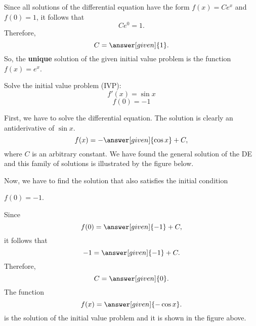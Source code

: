 \documentclass{ximera}
\begin{document}
\begin{question}
\begin{feedback}
Since all solutions of the differential equation have the form $f(x)=Ce^x$ and $f(0)=1$, it follows that 
  \[
  Ce^0 = 1.
  \]
Therefore,
 \[
  C = \answer[given]{1}.
  \]
  So, the \textbf{unique} solution of the given initial value problem is the function $f(x)=e^x$.
  \end{feedback}
\end{question}

\begin{example}
Solve the initial value problem (IVP):
\[
f'(x)=\sin{x}
\]
\[
f(0)=-1
\]
\begin{explanation}
First, we have to solve the differential equation. The solution is clearly an antiderivative of $\sin{x}$.
\[
f(x)=-\answer[given]{\cos{x}}+C,
\]
where $C$ is an arbitrary constant. We have found the general solution of the DE  and this family of solutions is illustrated by the figure below. 
   \begin{image}
\end{image}
Now, we have to find the solution that also satisfies the initial condition 

$f(0)=-1$.

Since
\[
f(0)=\answer[given]{-1}+C,
\]
 it follows that
\[
-1=\answer[given]{-1}+C.
\]
Therefore,
\[
C=\answer[given]{0}.
\]
The function 
\[
f(x)=\answer[given]{-\cos{x}}.
\]
is the solution of the initial value problem and it is shown in the figure above.
\end{explanation}
\end{example}
\end{document}
